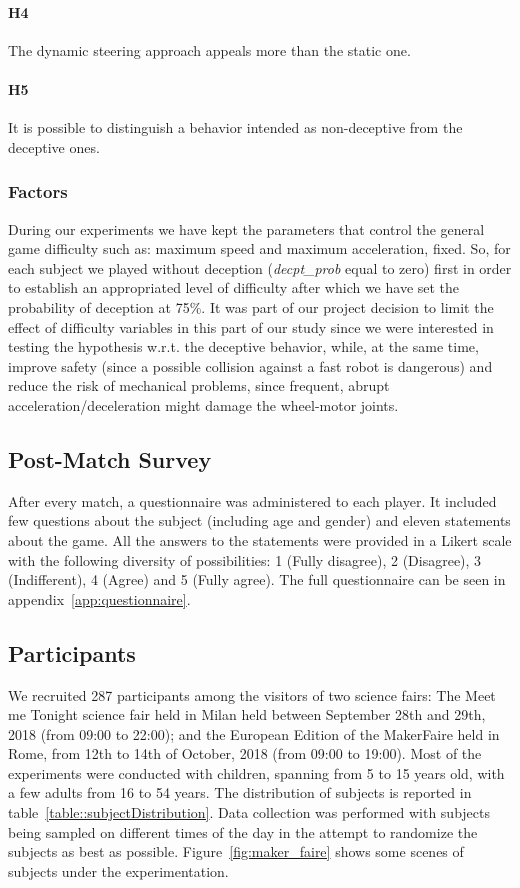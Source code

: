 \paragraph{H4} The dynamic steering approach appeals more than the static one.
\paragraph{H5} It is possible to distinguish a behavior intended as non-deceptive from the deceptive ones.

\subsubsection{Factors}
During our experiments we have kept the parameters that control the general game difficulty such as: maximum speed and maximum acceleration, fixed. So, for each subject we played without deception (\textit{decpt\_prob} equal to zero) first in order to establish an appropriated level of difficulty after which we have set the probability of deception at 75\%. It was part of our project decision to limit the effect of difficulty variables in this part of our study since we were interested in testing the hypothesis w.r.t. the deceptive behavior, while, at the same time, improve safety (since a possible collision against a fast robot is dangerous) and reduce the risk of mechanical problems, since frequent, abrupt acceleration/deceleration might damage the wheel-motor joints.

\subsection{Post-Match Survey}

After every match, a questionnaire was administered to each player. It included few questions about the subject (including age and gender) and eleven statements about the game. All the answers to the statements were provided in a Likert scale with the following diversity of possibilities: 1 (Fully disagree), 2 (Disagree), 3 (Indifferent), 4 (Agree) and 5 (Fully agree). The full questionnaire can be seen in appendix~\ref{app:questionnaire}. 

\subsection{Participants}
We recruited 287 participants among the visitors of two science fairs: The Meet me Tonight science fair held in Milan held between September 28th and 29th, 2018 (from 09:00 to 22:00); and the European Edition of the MakerFaire held in Rome, from 12th to 14th of October, 2018 (from 09:00 to 19:00). Most of the experiments were conducted with children, spanning from 5 to 15 years old, with a few adults from 16 to 54 years. The distribution of subjects is reported in table~\ref{table::subjectDistribution}. Data collection was performed with subjects being sampled on different times of the day in the attempt to randomize the subjects as best as possible. Figure~\ref{fig:maker_faire} shows some scenes of subjects under the experimentation.

